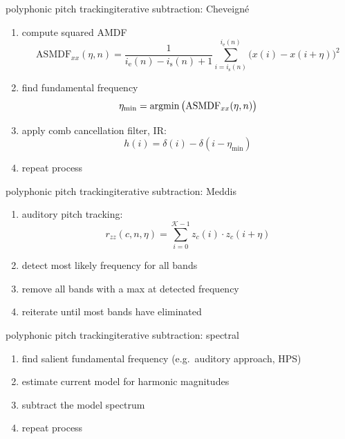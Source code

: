 	\begin{frame}{polyphonic pitch tracking}{iterative subtraction: Cheveign\'e}
		\begin{enumerate}
			\item	compute squared AMDF
				\begin{equation*}
					\mathrm{ASMDF}_{xx}(\eta,n) = \frac{1}{i_{\mathrm{e}}(n)-i_{\mathrm{s}}(n)+1}\sum\limits_{i=i_{\mathrm{s}}(n)}^{i_{\mathrm{e}}(n)}{\big(x(i)- x(i+\eta)\big)^2}
				\end{equation*}
			\item<2->	find fundamental frequency
				\begin{equation*}
					\eta_{\mathrm{min}} = \operatorname*{argmin} \big(\mathrm{ASMDF}_{xx}(\eta,n)\big)
				\end{equation*}
			\item<3->	apply comb cancellation filter, IR:
				\begin{equation*}
					h(i) = \delta(i) - \delta(i-\eta_{\mathrm{min}})
				\end{equation*}
			\item<4->	repeat process
		\end{enumerate}			
	\end{frame}
	
	\begin{frame}{polyphonic pitch tracking}{iterative subtraction: Meddis}
		\begin{enumerate}
			\item	auditory pitch tracking:
				\begin{equation*}
					r_{zz} (c,n,\eta) = \sum\limits_{i = 0}^{\mathcal{K}-1}{z_c(i)\cdot z_c(i+\eta)}
				\end{equation*}
			\pause
			\item	detect most likely frequency for all bands
			\pause
			\item	remove all bands with a max at detected frequency
			\pause
			\item	reiterate until most bands have eliminated			
		\end{enumerate}
	\end{frame}
	
	\begin{frame}{polyphonic pitch tracking}{iterative subtraction: spectral}
		\begin{enumerate}
			\item	find salient fundamental frequency (e.g.\ auditory approach, HPS)
			\pause
			\item	estimate current model for harmonic magnitudes
			\pause
			\item	subtract the model spectrum
			\pause
			\item	repeat process
		\end{enumerate}
	\end{frame}
	
